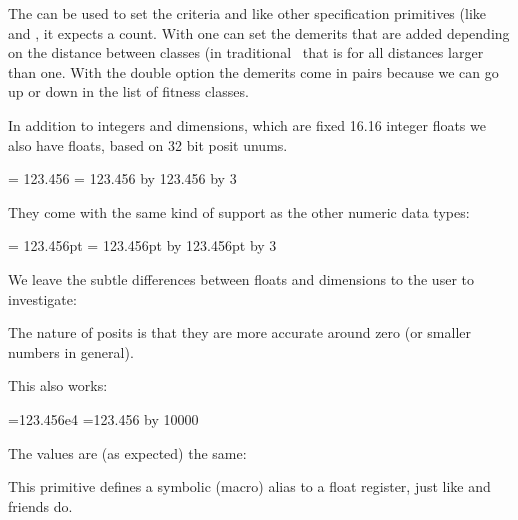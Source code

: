 The  can be used to set the criteria and like other
specification primitives (like  and , it
expects a count. With  one can set the demerits that are
added depending on the distance between classes (in traditional \TEX\ that is
 for all distances larger than one. With the double option the
demerits come in pairs because we can go up or down in the list of fitness
classes.

\stopnewprimitive

\startnewprimitive[title={\prm {float}}]

In addition to integers and dimensions, which are fixed 16.16 integer floats we
also have  floats, based on 32 bit posit unums.

\startbuffer
{} = 123.456           \the{}
 = 123.456           \the{}
\advance {} by 123.456 \the{}
\advance {} by  \the{}
\divideby{} 3          \the{}
\stopbuffer

\typebuffer

They come with the same kind of support as the other numeric data types:

\startlines \getbuffer \stoplines

\startbuffer
{} = 123.456pt          \the{}
 = 123.456pt          \the{}
\advance {} by 123.456pt \the{}
\advance {} by    \the{}
\divideby{} 3            \the{}
\stopbuffer

We leave the subtle differences between floats and dimensions to the user to
investigate:

\typebuffer

The nature of posits is that they are more accurate around zero (or smaller
numbers in general).

\startlines \getbuffer \stoplines

This also works:

\startbuffer
{}=123.456e4
=123.456    \multiply{} by 10000
\the{}
\the{}
\stopbuffer

\typebuffer

The values are (as expected) the same:

\startlines \getbuffer \stoplines

\stopnewprimitive

\startnewprimitive[title={\prm {floatdef}}]

This primitive defines a symbolic (macro) alias to a float register, just like
 and friends do.

